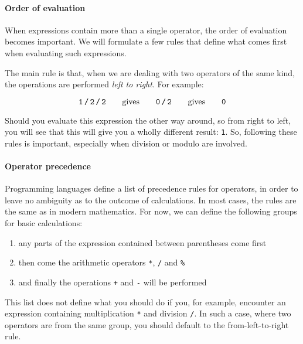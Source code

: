 \paragraph{Order of evaluation}

When expressions contain more than a single operator, the order of evaluation becomes important. We will formulate a few rules that define what comes first when evaluating such expressions.

The main rule is that, when we are dealing with two operators of the same kind, the operations are performed \emph{left to right}. For example:

\begin{equation*}
\texttt{1\,/\,2\,/\,2} \qquad\text{gives}\qquad \texttt{0\,/\,2} \qquad\text{gives}\qquad \texttt{0}
\end{equation*}

Should you evaluate this expression the other way around, so from right to left, you will see that this will give you a wholly different result: \texttt{1}. So, following these rules is important, especially when division or modulo are involved.

\paragraph{Operator precedence}

Programming languages define a list of precedence rules for operators, in order to leave no ambiguity as to the outcome of calculations. In most cases, the rules are the same as in modern mathematics. For now, we can define the following groups for basic calculations:

\begin{enumerate}
    \item any parts of the expression contained between parentheses come first
    \item then come the arithmetic operators \texttt{*}, \texttt{/} and \texttt{\%}
    \item and finally the operations \texttt{+} and \texttt{-} will be performed
\end{enumerate}

This list does not define what you should do if you, for example, encounter an expression containing multiplication \texttt{*} and division \texttt{/}. In such a case, where two operators are from the same group, you should default to the from-left-to-right rule.
